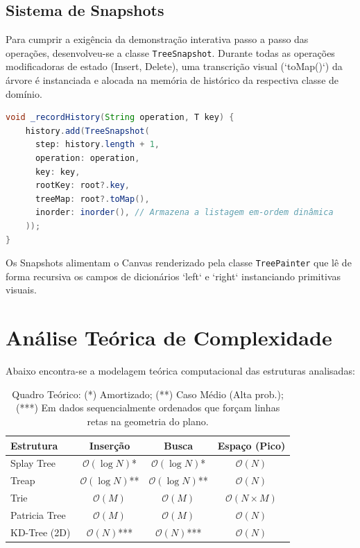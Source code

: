 \documentclass[12pt,a4paper]{article}
\begin{document}
\subsection{Sistema de Snapshots}
Para cumprir a exigência da demonstração interativa passo a passo das operações, desenvolveu-se a classe \texttt{TreeSnapshot}. Durante todas as operações modificadoras de estado (Insert, Delete), uma transcrição visual (`toMap()`) da árvore é instanciada e alocada na memória de histórico da respectiva classe de domínio.

\begin{lstlisting}[language=Java, caption=Captura do Estado em Snapshot nas operações]
void _recordHistory(String operation, T key) {
    history.add(TreeSnapshot(
      step: history.length + 1,
      operation: operation,
      key: key,
      rootKey: root?.key,
      treeMap: root?.toMap(),
      inorder: inorder(), // Armazena a listagem em-ordem dinâmica
    ));
}
\end{lstlisting}

Os Snapshots alimentam o Canvas renderizado pela classe \texttt{TreePainter} que lê de forma recursiva os campos de dicionários `left` e `right` instanciando primitivas visuais.

\section{Análise Teórica de Complexidade}
Abaixo encontra-se a modelagem teórica computacional das estruturas analisadas:

\begin{table}[H]
\centering
\begin{tabular}{@{}lccc@{}}
\toprule
\textbf{Estrutura} & \textbf{Inserção} & \textbf{Busca} & \textbf{Espaço (Pico)} \\ \midrule
Splay Tree & $\mathcal{O}(\log N)$* & $\mathcal{O}(\log N)$* & $\mathcal{O}(N)$ \\
Treap & $\mathcal{O}(\log N)$** & $\mathcal{O}(\log N)$** & $\mathcal{O}(N)$ \\
Trie & $\mathcal{O}(M)$ & $\mathcal{O}(M)$ & $\mathcal{O}(N \times M)$ \\
Patricia Tree & $\mathcal{O}(M)$ & $\mathcal{O}(M)$ & $\mathcal{O}(N)$ \\
KD-Tree (2D) & $\mathcal{O}(N)$*** & $\mathcal{O}(N)$*** & $\mathcal{O}(N)$ \\ \bottomrule
\end{tabular}
\caption{Quadro Teórico: (*) Amortizado; (**) Caso Médio (Alta prob.); (***) Em dados sequencialmente ordenados que forçam linhas retas na geometria do plano.}
\end{table}
\end{document}
